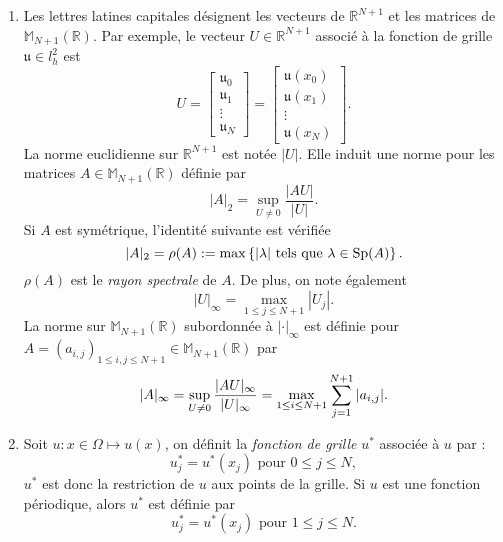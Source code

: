 \begin{enumerate}
\item Les lettres latines capitales désignent les vecteurs de $\mathbb{R}^{N+1}$ et les matrices de $\mathbb{M}_{N+1}(\mathbb{R})$. Par exemple, le vecteur $U \in \mathbb{R}^{N+1}$ associé à la fonction de grille $\mathfrak{u} \in l^2_h$ est
\begin{equation}
U = \begin{bmatrix}
\mathfrak{u}_0 \\ \mathfrak{u}_1 \\ \vdots \\ \mathfrak{u}_N
\end{bmatrix} =
\begin{bmatrix}
\mathfrak{u}(x_0) \\ \mathfrak{u}(x_1) \\ \vdots \\ \mathfrak{u}(x_N)
\end{bmatrix}.
\end{equation}
La norme euclidienne sur $\mathbb{R}^{N+1}$ est notée $|U|$. Elle induit une norme pour les matrices $A \in \mathbb{M}_{N+1}(\mathbb{R})$ définie par
\begin{equation}
|A|_2 = \sup_{U \neq 0} \dfrac{|AU|}{|U|}.
\end{equation}
Si $A$ est symétrique, l'identité suivante est vérifiée
\begin{equation}
|A|_2 = \rho(A) := \max \left\lbrace |\lambda| \text{ tels que } \lambda \in \text{Sp} (A) \right\rbrace.
\end{equation}
$\rho(A)$ est le \textit{rayon spectrale} de $A$.
De plus, on note également
\begin{equation}
|U|_{\infty} = \max_{1 \leq j \leq N+1} |U_j|.
\end{equation}
La norme sur $\mathbb{M}_{N+1}(\mathbb{R})$ subordonnée à $|\cdot|_{\infty}$ est définie pour $A=(a_{i,j})_{1 \leq i,j \leq N+1} \in \mathbb{M}_{N+1}(\mathbb{R})$ par
\begin{equation}
|A|_{\infty} = \sup_{U \neq 0} \dfrac{|AU|_{\infty}}{|U|_{\infty}} = \max_{1 \leq i \leq N+1} \displaystyle\sum\limits_{j=1}^{N+1} |a_{i,j}|.
\end{equation}



\item Soit $u: x \in \Omega \mapsto u(x)$, on définit la \textit{fonction de grille} $u^*$ associée à $u$ par :
\begin{equation}
u^*_j = u^*(x_j) \text{ pour } 0 \leq j \leq N,
\end{equation}
$u^*$ est donc la restriction de $u$ aux points de la grille. Si $u$ est une fonction périodique, alors $u^*$ est définie par
\begin{equation}
u^*_j = u^*(x_j) \text{ pour } 1 \leq j \leq N.
\end{equation}
\end{enumerate}

